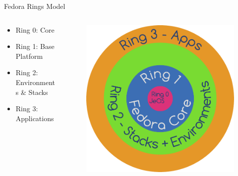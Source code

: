 \documentclass{beamer}
\begin{document}
\begin{frame}{Fedora Rings Model}
  \begin{columns}
    \begin{column}{.5\textwidth}
  \begin{itemize}
    \item Ring 0: Core
    \item Ring 1: Base Platform
    \item Ring 2: Environments \& Stacks
    \item Ring 3: Applications
  \end{itemize}
    \end{column}
    \begin{column}{.5\textwidth}
      \begin{figure}[htbp]
        \centering
        \includegraphics[width=.8\textwidth]{fedora-next-ring.pdf}
      \end{figure}
    \end{column}
  \end{columns}
\end{frame}

\end{document}
